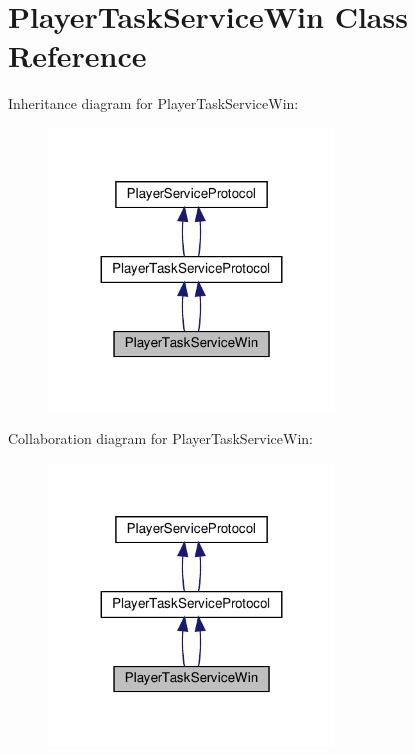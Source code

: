 \hypertarget{classPlayerTaskServiceWin}{}\section{Player\+Task\+Service\+Win Class Reference}
\label{classPlayerTaskServiceWin}


Inheritance diagram for Player\+Task\+Service\+Win\+:
\nopagebreak
\begin{figure}[H]
\begin{center}
\leavevmode
\includegraphics[width=215pt]{classPlayerTaskServiceWin__inherit__graph}
\end{center}
\end{figure}


Collaboration diagram for Player\+Task\+Service\+Win\+:
\nopagebreak
\begin{figure}[H]
\begin{center}
\leavevmode
\includegraphics[width=215pt]{classPlayerTaskServiceWin__coll__graph}
\end{center}
\end{figure}
